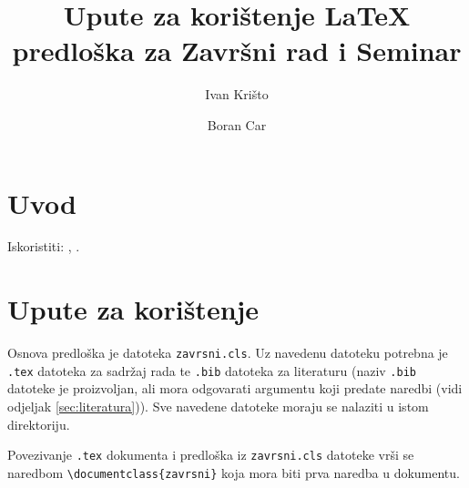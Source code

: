 \documentclass{zavrsni}
\begin{document}
\title{Upute za korištenje \LaTeX{} predloška za Završni rad i Seminar}
\author{Ivan Krišto \and Boran Car}

\maketitle

\tableofcontents

\chapter{Uvod}

Iskoristiti: \citep{taraborelli2009beauty}, \citep{cottrell1999word}.

\chapter{Upute za korištenje}
Osnova predloška je datoteka \texttt{zavrsni.cls}. Uz navedenu datoteku potrebna
je \texttt{.tex} datoteka za sadržaj rada te \texttt{.bib} datoteka za literaturu
(naziv \texttt{.bib} datoteke je proizvoljan, ali mora odgovarati argumentu koji
predate naredbi \verb|| (vidi odjeljak \ref{sec:literatura})). Sve
navedene datoteke moraju se nalaziti u istom direktoriju.

Povezivanje \texttt{.tex} dokumenta i predloška iz \texttt{zavrsni.cls}
datoteke vrši se naredbom \verb|\documentclass{zavrsni}| koja mora biti prva
naredba u dokumentu.
\end{document}
